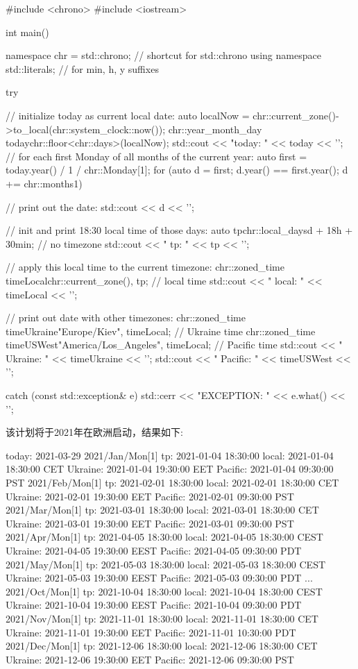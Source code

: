 \begin{cpp}
#include <chrono>
#include <iostream>

int main()
{
	namespace chr = std::chrono; // shortcut for std::chrono
	using namespace std::literals; // for min, h, y suffixes

	try {
		// initialize today as current local date:
		auto localNow = chr::current_zone()->to_local(chr::system_clock::now());
		chr::year_month_day today{chr::floor<chr::days>(localNow)};
		std::cout << "today: " << today << '\n';
		// for each first Monday of all months of the current year:
		auto first = today.year() / 1 / chr::Monday[1];
		for (auto d = first; d.year() == first.year(); d += chr::months{1}) {
			// print out the date:
			std::cout << d << '\n';

			// init and print 18:30 local time of those days:
			auto tp{chr::local_days{d} + 18h + 30min}; // no timezone
			std::cout << " tp: " << tp << '\n';

			// apply this local time to the current timezone:
			chr::zoned_time timeLocal{chr::current_zone(), tp}; // local time
			std::cout << " local: " << timeLocal << '\n';

			// print out date with other timezones:
			chr::zoned_time timeUkraine{"Europe/Kiev", timeLocal}; // Ukraine time
			chr::zoned_time timeUSWest{"America/Los_Angeles", timeLocal}; // Pacific time
			std::cout << " Ukraine: " << timeUkraine << '\n';
			std::cout << " Pacific: " << timeUSWest << '\n';
		}
	}
	catch (const std::exception& e) {
		std::cerr << "EXCEPTION: " << e.what() << '\n';
	}
}
\end{cpp}

该计划将于2021年在欧洲启动，结果如下:

\begin{shell}
today: 2021-03-29
2021/Jan/Mon[1]
    tp:      2021-01-04 18:30:00
    local:   2021-01-04 18:30:00 CET
    Ukraine: 2021-01-04 19:30:00 EET
    Pacific: 2021-01-04 09:30:00 PST
2021/Feb/Mon[1]
    tp:      2021-02-01 18:30:00
    local:   2021-02-01 18:30:00 CET
    Ukraine: 2021-02-01 19:30:00 EET
    Pacific: 2021-02-01 09:30:00 PST
2021/Mar/Mon[1]
    tp:      2021-03-01 18:30:00
    local:   2021-03-01 18:30:00 CET
    Ukraine: 2021-03-01 19:30:00 EET
    Pacific: 2021-03-01 09:30:00 PST
2021/Apr/Mon[1]
    tp:      2021-04-05 18:30:00
    local:   2021-04-05 18:30:00 CEST
    Ukraine: 2021-04-05 19:30:00 EEST
    Pacific: 2021-04-05 09:30:00 PDT
2021/May/Mon[1]
    tp:      2021-05-03 18:30:00
    local:   2021-05-03 18:30:00 CEST
    Ukraine: 2021-05-03 19:30:00 EEST
    Pacific: 2021-05-03 09:30:00 PDT
...
2021/Oct/Mon[1]
    tp:      2021-10-04 18:30:00
    local:   2021-10-04 18:30:00 CEST
    Ukraine: 2021-10-04 19:30:00 EEST
    Pacific: 2021-10-04 09:30:00 PDT
2021/Nov/Mon[1]
    tp:      2021-11-01 18:30:00
    local:   2021-11-01 18:30:00 CET
    Ukraine: 2021-11-01 19:30:00 EET
    Pacific: 2021-11-01 10:30:00 PDT
2021/Dec/Mon[1]
    tp:      2021-12-06 18:30:00
    local:   2021-12-06 18:30:00 CET
    Ukraine: 2021-12-06 19:30:00 EET
    Pacific: 2021-12-06 09:30:00 PST
\end{shell}

